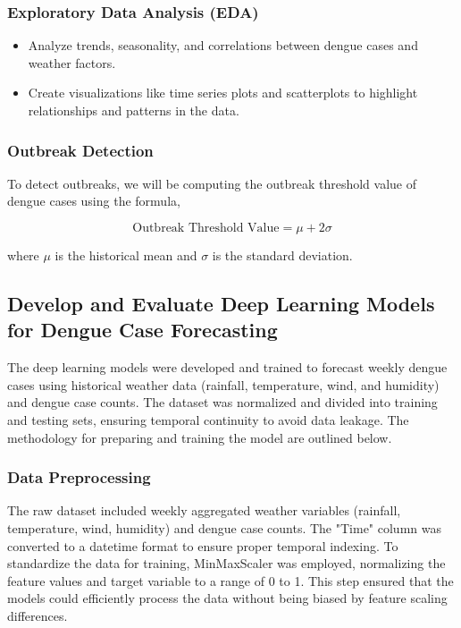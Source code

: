 \subsubsection{Exploratory Data Analysis (EDA)}
\begin{itemize}
	\item Analyze trends, seasonality, and correlations between dengue cases and weather factors.
	\item Create visualizations like time series plots and scatterplots to highlight relationships and patterns in the data.
\end{itemize}

\subsubsection{Outbreak Detection}
To detect outbreaks, we will be computing the outbreak threshold value of dengue cases using the formula, 

\begin{equation}
	\text{Outbreak Threshold Value} = \mu + 2\sigma
\end{equation}

where \(\mu\) is the historical mean and \(\sigma \) is the standard deviation.

\subsection{Develop and Evaluate Deep Learning Models for Dengue Case Forecasting}
The deep learning models were developed and trained to forecast weekly dengue cases using historical weather data (rainfall, temperature, wind, and humidity) and dengue case counts. The dataset was normalized and divided into training and testing sets, ensuring temporal continuity to avoid data leakage. The methodology for preparing and training the model are outlined below.
\subsubsection{Data Preprocessing}
The raw dataset included weekly aggregated weather variables (rainfall, temperature, wind, humidity) and dengue case counts. The "Time" column was converted to a datetime format to ensure proper temporal indexing. To standardize the data for training, MinMaxScaler was employed, normalizing the feature values and target variable to a range of 0 to 1. This step ensured that the models could efficiently process the data without being biased by feature scaling differences.

